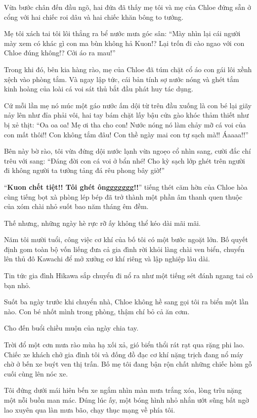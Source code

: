 \documentclass[../main.tex]{subfiles}
\begin{document}
Vừa bước chân đến đầu ngõ, hai đứa đã thấy mẹ tôi và mẹ của Chloe đứng sẵn ở cổng với hai chiếc roi dâu và hai chiếc khăn bông to tướng.

Mẹ tôi xách tai tôi lôi thẳng ra bể nước mưa góc sân: ``Mày nhìn lại cái người mày xem có khác gì con ma bùn không hả Kuon!? Lại trốn đi cào ngao với con Chloe đúng không!? Cởi áo ra mau!''

Trong khi đó, bên kia hàng rào, mẹ của Chloe đã túm chặt cổ áo con gái lôi xềnh xệch vào phòng tắm. Và ngay lập tức, cái bản tính sợ nước nóng và ghét tắm kinh hoàng của loài cá voi sát thủ bắt đầu phát huy tác dụng.

Cứ mỗi lần mẹ nó múc một gáo nước ấm dội từ trên đầu xuống là con bé lại giãy nảy lên như đỉa phải vôi, hai tay bám chặt lấy bậu cửa gào khóc thảm thiết như bị xẻ thịt: ``Oa oa oa! Mẹ ơi tha cho con! Nước nóng nó làm chảy mỡ cá voi của con mất thôi!! Con không tắm đâu! Con thề ngày mai con tự sạch mà!! Áaaaa!!''

Bên này bờ rào, tôi vừa đứng dội nước lạnh vừa ngoẹo cổ nhìn sang, cười đắc chí trêu với sang: ``Đáng đời con cá voi ở bẩn nhé! Cho kỳ sạch lớp ghét trên người đi không người ta tưởng tảng đá rêu phong bây giờ!''

``\textbf{Kuon chết tiệt!! Tôi ghét ônggggggg!!}'' tiếng thét căm hờn của Chloe hòa cùng tiếng bọt xà phòng lép bép đã trở thành một phần âm thanh quen thuộc của xóm chài nhỏ suốt bao năm tháng êm đềm.

Thế nhưng, những ngày hè rực rỡ ấy không thể kéo dài mãi mãi.

Năm tôi mười tuổi, công việc cơ khí của bố tôi có một bước ngoặt lớn. Bố quyết định gom toàn bộ vốn liếng đưa cả gia đình rời khỏi làng chài ven biển, chuyển lên thủ đô Kawachi để mở xưởng cơ khí riêng và lập nghiệp lâu dài.

Tin tức gia đình Hikawa sắp chuyển đi nổ ra như một tiếng sét đánh ngang tai cô bạn nhỏ.

Suốt ba ngày trước khi chuyển nhà, Chloe không hề sang gọi tôi ra biển một lần nào. Con bé nhốt mình trong phòng, thậm chí bỏ cả ăn cơm.

Cho đến buổi chiều muộn của ngày chia tay.

Trời đổ một cơn mưa rào mùa hạ xối xả, gió biển thổi rát rạt qua rặng phi lao. Chiếc xe khách chở gia đình tôi và đống đồ đạc cơ khí nặng trịch đang nổ máy chờ ở bến xe buýt ven thị trấn. Bố mẹ tôi đang bận rộn chất những chiếc hòm gỗ cuối cùng lên nóc xe.

Tôi đứng dưới mái hiên bến xe ngắm nhìn màn mưa trắng xóa, lòng trĩu nặng một nỗi buồn man mác. Đúng lúc ấy, một bóng hình nhỏ nhắn ướt sũng bất ngờ lao xuyên qua làn mưa bão, chạy thục mạng về phía tôi.
\end{document}
